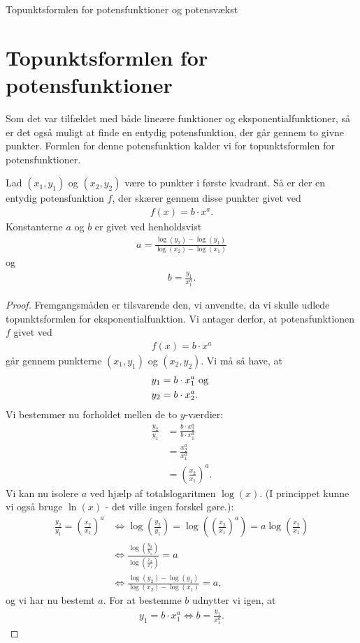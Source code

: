 \begin{center}
\Huge
Topunktsformlen for potensfunktioner og potensvækst
\end{center}
\section*{Topunktsformlen for potensfunktioner}
Som det var tilfældet med både lineære funktioner og eksponentialfunktioner, så er det også muligt at finde en entydig potensfunktion, der går gennem to givne punkter. Formlen for denne potensfunktion kalder vi for topunktsformlen for potensfunktioner.
\begin{setn}
Lad $(x_1,y_1)$ og $(x_2,y_2)$ være to punkter i første kvadrant. Så er der en entydig potensfunktion $f$, der skærer gennem disse punkter givet ved
\begin{align*}
f(x) = b\cdot x^a.
\end{align*}
Konstanterne $a$ og $b$ er givet ved henholdsvist
\begin{align*}
a = \frac{\log(y_2)-\log(y_1)}{\log(x_2)-\log(x_1)}
\end{align*}
og
\begin{align*}
b = \frac{y_1}{x_1^{a}}.
\end{align*}
\end{setn}
\begin{proof}
Fremgangsmåden er tilsvarende den, vi anvendte, da vi skulle udlede topunktsformlen for eksponentialfunktion. Vi antager derfor, at potensfunktionen $f$ givet ved
\begin{align*}
f(x) = b\cdot x^a
\end{align*}
går gennem punkterne $(x_1,y_1)$ og $(x_2,y_2)$. Vi må så have, at 
\begin{align*}
y_1 &= b\cdot x_1^a \textnormal{ og }\\ y_2 &= b\cdot x_2^a.
\end{align*}
Vi bestemmer nu forholdet mellen de to $y$-værdier:
\begin{align*}
\frac{y_2}{y_1} &= \frac{b\cdot x_2^a}{b\cdot x_1^a}\\
&= \frac{x_2^a}{x_1^a}\\
&= \left(\frac{x_2}{x_1}\right)^a.
\end{align*}
Vi kan nu isolere $a$ ved hjælp af totalslogaritmen $\log(x)$. (I princippet kunne vi også bruge $\ln(x)$ - det ville ingen forskel gøre.):
\begin{align*}
\frac{y_2}{y_1} = \left(\frac{x_2}{x_1}\right)^a &\Leftrightarrow \log\left(\frac{y_2}{y_1}\right) = \log\left(\left(\frac{x_2}{x_1}\right)^a\right) = a\log\left(\frac{x_2}{x_1}\right)\\
&\Leftrightarrow \frac{\log\left(\frac{y_2}{y_1}\right)}{\log\left(\frac{x_2}{x_1}\right)} = a\\
&\Leftrightarrow \frac{\log(y_2)-\log(y_1)}{\log(x_2)-\log(x_1)} = a,
\end{align*}
og vi har nu bestemt $a$. 
For at bestemme $b$ udnytter vi igen, at 
\begin{align*}
y_1 = b\cdot x_1^a \Leftrightarrow b = \frac{y_1}{x_1^a}.
\end{align*} 
\end{proof}
